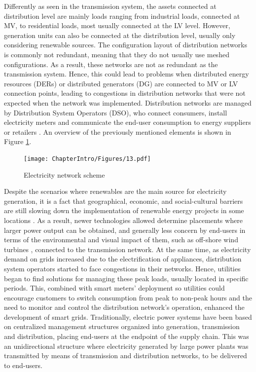 Differently as seen in the transmission system, the assets connected at distribution level are mainly loads ranging from industrial loads, connected at MV, to residential loads, most usually connected at the LV level. However, generation units can also be connected  at the distribution level, usually only considering renewable sources. The configuration layout of distribution networks is commonly not redundant, meaning that they do not usually use meshed configurations. As a result, these networks are not as redundant as the transmission system. Hence, this could lead to problems when distributed energy resources (DERs) or distributed generators (DG) are connected to MV or LV connection points, leading to congestions  in distribution networks that were not expected when the network was implemented. Distribution networks are managed by Distribution System Operators (DSO), who connect consumers, install electricity meters and communicate the end-user consumption to energy suppliers or retailers \cite{Erbach2016}. An overview of the previously mentioned elements is shown in Figure \ref{fig:networkscheme}. 


\begin{figure}[htbp]
	\centering 
	\texttt{[image: ChapterIntro/Figures/13.pdf]}
		\caption{Electricity network scheme}  
		\label{fig:networkscheme}
\end{figure}


Despite the scenarios where renewables are the main source for electricity generation, it is a fact that geographical, economic, and social-cultural barriers are still slowing down the implementation of renewable energy projects in some locations \cite{ASANTE2020111479, barriers2020}. As a result, newer technologies allowed determine placements where larger power output can be obtained, and generally less concern by end-users in terms of the environmental and visual impact of them, such as off-shore wind turbines \cite{Kaldellis2016, KPMG2019}, connected to the transmission network. At the same time, as electricity demand on grids increased due to the electrification of appliances, distribution system operators started to face congestions in their networks. Hence, utilities began to find solutions for managing these peak loads, usually located in specific periods.  This, combined with smart meters' deployment so utilities could encourage customers to switch consumption from peak to non-peak hours and the need to monitor and control the distribution network's operation, enhanced the development of smart grids.
Traditionally, electric power systems have been based on centralized management structures organized into generation, transmission and distribution, placing end-users at the endpoint of the supply chain. This was an unidirectional structure where electricity generated by large power plants was transmitted by means of transmission and distribution networks, to be delivered to end-users. 

